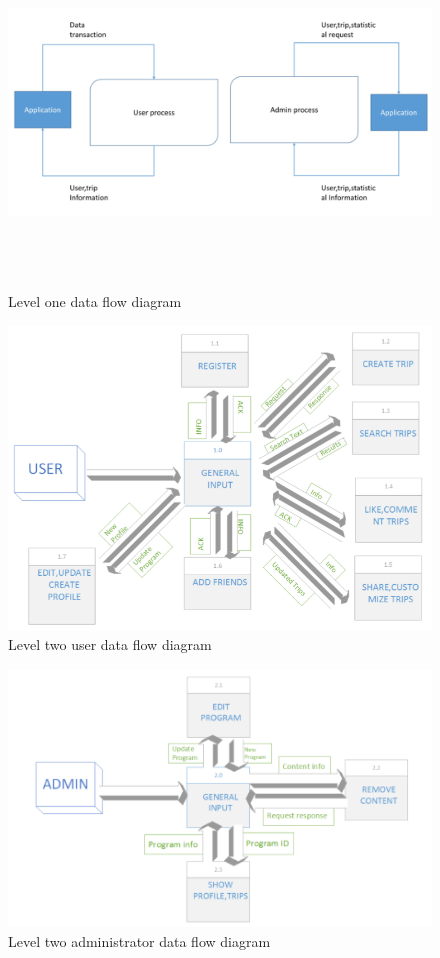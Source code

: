 \begin{figure}[!htbp]
\centering
\includegraphics[width=\textwidth, height= 25em]{projectChapters/images/dataflow2.png}
\caption{Level one data flow diagram}
\label{fig:dataflow2}
\end{figure}

\begin{figure}[!htbp]
\centering
\includegraphics[width=\textwidth]{projectChapters/images/dataflow3.png}
\caption{Level two user data flow diagram}
\label{fig:userdataflow}
\end{figure}

\begin{figure}[!htbp]
\centering
\includegraphics[width=\textwidth]{projectChapters/images/dataflow4.png}
\caption{Level two administrator data flow diagram}
\label{fig:admindataflow}
\end{figure}





